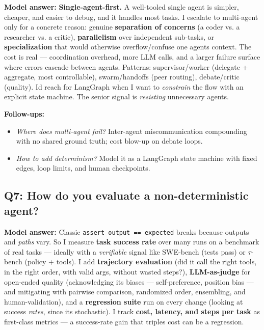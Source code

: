 \documentclass[11pt]{article}
\providecommand{\tightlist}{\setlength{\itemsep}{1pt}\setlength{\parskip}{0pt}}
\begin{document}
\textbf{Model answer:} \textbf{Single-agent-first.} A well-tooled single agent is simpler, cheaper, and easier to debug, and it handles most tasks. I escalate to multi-agent only for a concrete reason: genuine \textbf{separation of concerns} (a coder vs. a researcher vs. a critic), \textbf{parallelism} over independent sub-tasks, or \textbf{specialization} that would otherwise overflow/confuse one agent\textquotesingle s context. The cost is real --- coordination overhead, more LLM calls, and a larger failure surface where errors cascade between agents. Patterns: supervisor/worker (delegate + aggregate, most controllable), swarm/handoffs (peer routing), debate/critic (quality). I\textquotesingle d reach for LangGraph when I want to \emph{constrain} the flow with an explicit state machine. The senior signal is \emph{resisting} unnecessary agents.

\textbf{Follow-ups:}

\begin{itemize}
\tightlist
\item
  \emph{Where does multi-agent fail?} Inter-agent miscommunication compounding with no shared ground truth; cost blow-up on debate loops.
\item
  \emph{How to add determinism?} Model it as a LangGraph state machine with fixed edges, loop limits, and human checkpoints.
\end{itemize}

\subsection{Q7: How do you evaluate a non-deterministic agent?}\label{q7-how-do-you-evaluate-a-non-deterministic-agent}

\textbf{Model answer:} Classic \texttt{assert\ output\ ==\ expected} breaks because outputs and \emph{paths} vary. So I measure \textbf{task success rate} over many runs on a benchmark of real tasks --- ideally with a \emph{verifiable} signal like SWE-bench (tests pass) or \(\tau\)-bench (policy + tools). I add \textbf{trajectory evaluation} (did it call the right tools, in the right order, with valid args, without wasted steps?), \textbf{LLM-as-judge} for open-ended quality (acknowledging its biases --- self-preference, position bias --- and mitigating with pairwise comparison, randomized order, ensembling, and human-validation), and a \textbf{regression suite} run on every change (looking at success \emph{rates}, since it\textquotesingle s stochastic). I track \textbf{cost, latency, and steps per task} as first-class metrics --- a success-rate gain that triples cost can be a regression.
\end{document}
